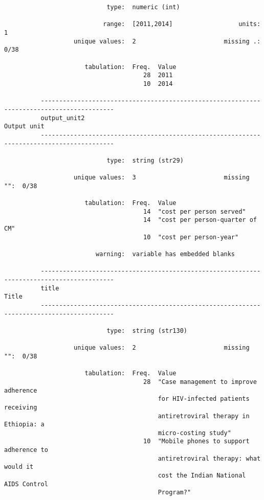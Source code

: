 \documentclass{article}
\begin{document}
\begin{verbatim}
                            type:  numeric (int)
          
                           range:  [2011,2014]                  units:  1
                   unique values:  2                        missing .:  0/38
          
                      tabulation:  Freq.  Value
                                      28  2011
                                      10  2014
          
          ------------------------------------------------------------------------------------------
          output_unit2                                                                   Output unit
          ------------------------------------------------------------------------------------------
          
                            type:  string (str29)
          
                   unique values:  3                        missing "":  0/38
          
                      tabulation:  Freq.  Value
                                      14  "cost per person served"
                                      14  "cost per person-quarter of CM"
                                      10  "cost per person-year"
          
                         warning:  variable has embedded blanks
          
          ------------------------------------------------------------------------------------------
          title                                                                                Title
          ------------------------------------------------------------------------------------------
          
                            type:  string (str130)
          
                   unique values:  2                        missing "":  0/38
          
                      tabulation:  Freq.  Value
                                      28  "Case management to improve adherence
                                          for HIV-infected patients receiving
                                          antiretroviral therapy in Ethiopia: a
                                          micro-costing study"
                                      10  "Mobile phones to support adherence to
                                          antiretroviral therapy: what would it
                                          cost the Indian National AIDS Control
                                          Program?"
          

\end{verbatim}
\end{document}

